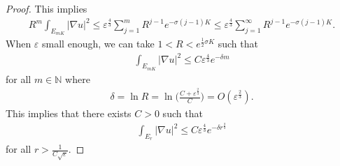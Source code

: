 \documentclass[11pt]{amsart}
\theoremstyle{plain}
\theoremstyle{definition}
\numberwithin{equation}{section}
\renewcommand{\leq}{\leqslant}
\begin{document}
\begin{proof}
This implies
\begin{align}
R^{m}\int_{E_{mK}}|\nabla u|^2\leq \varepsilon^{\frac{4}{3}}
\sum_{j=1}^mR^{j-1}e^{-\sigma(j-1)K}\leq \varepsilon^{\frac{4}{3}}
\sum_{j=1}^{\infty}R^{j-1}e^{-\sigma(j-1)K}.
\end{align}
When $\varepsilon$ small enough, we can take $1<R<e^{\frac{1}{2}\sigma K}$ such that \begin{align}
\int_{E_{mK}}|\nabla u|^2\leq C\varepsilon^{\frac{4}{3}}
 e^{-\delta m}
\end{align}
for all $m\in\mathbb{N}$ where 
\begin{align}
\delta=\ln R=\ln \Big(\frac{C+\varepsilon^{\frac{2}{3}}}{C}\Big)=O(\varepsilon^{\frac{2}{3}}).
\end{align}
This implies that there exists $C>0$ such that
\begin{align}\label{outside_est}
\int_{E_{r}}|\nabla u|^2\leq C\varepsilon^{\frac{4}{3}}
 e^{-\delta r^{\frac{2}{3}}}
\end{align}
for all $r>\frac{1}{C\sqrt{\varepsilon}}$.


\end{proof}
\end{document}
